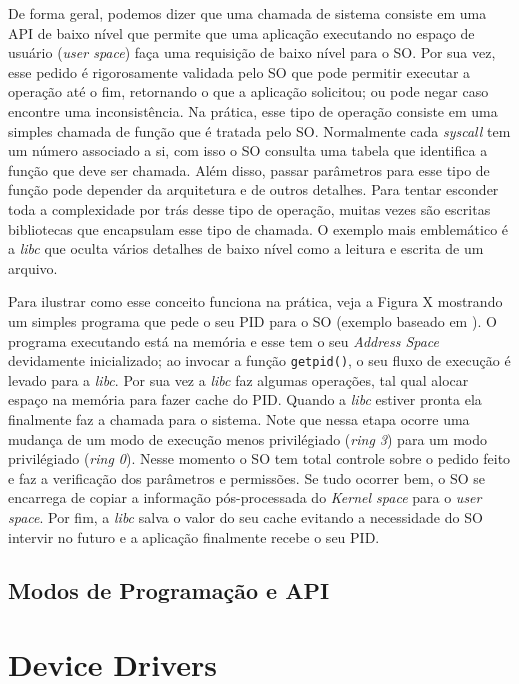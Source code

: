 De forma geral, podemos dizer que uma chamada de sistema consiste em uma API de
baixo nível que permite que uma aplicação executando no espaço de usuário
(\emph{user space}) faça uma requisição de baixo nível para o SO. Por sua vez,
esse pedido é rigorosamente validada pelo SO que pode permitir executar a
operação até o fim, retornando o que a aplicação solicitou; ou pode negar caso
encontre uma inconsistência. Na prática, esse tipo de operação consiste em uma
simples chamada de função que é tratada pelo SO. Normalmente cada
\emph{syscall} tem um número associado a si, com isso o SO consulta uma tabela
que identifica a função que deve ser chamada. Além disso, passar parâmetros
para esse tipo de função pode depender da arquitetura e de outros detalhes.
Para tentar esconder toda a complexidade por trás desse tipo de operação,
muitas vezes são escritas bibliotecas que encapsulam esse tipo de chamada. O
exemplo mais emblemático é a \emph{libc} que oculta vários detalhes de baixo
nível como a leitura e escrita de um arquivo.

Para ilustrar como esse conceito funciona na prática, veja a Figura X mostrando
um simples programa que pede o seu PID para o SO (exemplo baseado em
\cite{syscallex}). O programa executando está na memória e esse tem o seu
\emph{Address Space} devidamente inicializado; ao invocar a função
\texttt{getpid()}, o seu fluxo de execução é levado para a \emph{libc}. Por sua
vez a \emph{libc} faz algumas operações, tal qual alocar espaço na memória para
fazer cache do PID. Quando a \emph{libc} estiver pronta ela finalmente faz a
chamada para o sistema. Note que nessa etapa ocorre uma mudança de um modo de
execução menos privilégiado (\emph{ring 3}) para um modo privilégiado
(\emph{ring 0}). Nesse momento o SO tem total controle sobre o pedido feito e
faz a verificação dos parâmetros e permissões. Se tudo ocorrer bem, o SO se
encarrega de copiar a informação pós-processada do \emph{Kernel space} para o
\emph{user space}. Por fim, a \emph{libc} salva o valor do seu cache evitando a
necessidade do SO intervir no futuro e a aplicação finalmente recebe o seu PID.


\subsection{Modos de Programação e API}

\section{Device Drivers}
\label{sec:dd}

